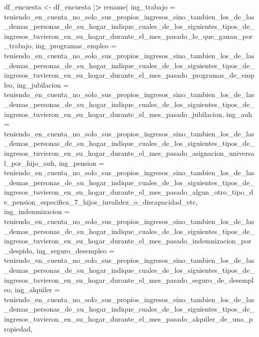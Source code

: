 \documentclass[
]{book}
\newenvironment{Shaded}{\begin{snugshade}}{\end{snugshade}}
\newcommand{\AttributeTok}[1]{\textcolor[rgb]{0.77,0.63,0.00}{#1}}
\newcommand{\ErrorTok}[1]{\textcolor[rgb]{0.64,0.00,0.00}{\textbf{#1}}}
\newcommand{\FunctionTok}[1]{\textcolor[rgb]{0.00,0.00,0.00}{#1}}
\newcommand{\NormalTok}[1]{#1}
\newcommand{\OtherTok}[1]{\textcolor[rgb]{0.56,0.35,0.01}{#1}}
\newcommand{\SpecialCharTok}[1]{\textcolor[rgb]{0.00,0.00,0.00}{#1}}
\theoremstyle{definition}
\theoremstyle{definition}
\theoremstyle{definition}
\theoremstyle{definition}
\theoremstyle{remark}
\begin{document}
\begin{Shaded}
\begin{Highlighting}[]
\NormalTok{df\_encuesta }\OtherTok{\textless{}{-}}\NormalTok{ df\_encuesta }\SpecialCharTok{|}\ErrorTok{\textgreater{}}
\FunctionTok{rename}\NormalTok{(}
\AttributeTok{ing\_trabajo =}\NormalTok{ teniendo\_en\_cuenta\_no\_solo\_sus\_propios\_ingresos\_sino\_tambien\_los\_de\_las\_demas\_personas\_de\_su\_hogar\_indique\_cuales\_de\_los\_siguientes\_tipos\_de\_ingresos\_tuvieron\_en\_su\_hogar\_durante\_el\_mes\_pasado\_lo\_que\_ganan\_por\_trabajo,}
\AttributeTok{ing\_programas\_empleo =}\NormalTok{ teniendo\_en\_cuenta\_no\_solo\_sus\_propios\_ingresos\_sino\_tambien\_los\_de\_las\_demas\_personas\_de\_su\_hogar\_indique\_cuales\_de\_los\_siguientes\_tipos\_de\_ingresos\_tuvieron\_en\_su\_hogar\_durante\_el\_mes\_pasado\_programas\_de\_empleo,}
\AttributeTok{ing\_jubilacion =}\NormalTok{ teniendo\_en\_cuenta\_no\_solo\_sus\_propios\_ingresos\_sino\_tambien\_los\_de\_las\_demas\_personas\_de\_su\_hogar\_indique\_cuales\_de\_los\_siguientes\_tipos\_de\_ingresos\_tuvieron\_en\_su\_hogar\_durante\_el\_mes\_pasado\_jubilacion,}
\AttributeTok{ing\_auh =}\NormalTok{ teniendo\_en\_cuenta\_no\_solo\_sus\_propios\_ingresos\_sino\_tambien\_los\_de\_las\_demas\_personas\_de\_su\_hogar\_indique\_cuales\_de\_los\_siguientes\_tipos\_de\_ingresos\_tuvieron\_en\_su\_hogar\_durante\_el\_mes\_pasado\_asignacion\_universal\_por\_hijo\_auh,}
\AttributeTok{ing\_pension =}\NormalTok{ teniendo\_en\_cuenta\_no\_solo\_sus\_propios\_ingresos\_sino\_tambien\_los\_de\_las\_demas\_personas\_de\_su\_hogar\_indique\_cuales\_de\_los\_siguientes\_tipos\_de\_ingresos\_tuvieron\_en\_su\_hogar\_durante\_el\_mes\_pasado\_algun\_otro\_tipo\_de\_pension\_especifica\_7\_hijos\_invalidez\_o\_discapacidad\_etc,}
\AttributeTok{ing\_indenmizacion =}\NormalTok{ teniendo\_en\_cuenta\_no\_solo\_sus\_propios\_ingresos\_sino\_tambien\_los\_de\_las\_demas\_personas\_de\_su\_hogar\_indique\_cuales\_de\_los\_siguientes\_tipos\_de\_ingresos\_tuvieron\_en\_su\_hogar\_durante\_el\_mes\_pasado\_indemnizacion\_por\_despido,}
\AttributeTok{ing\_seguro\_desempleo =}\NormalTok{ teniendo\_en\_cuenta\_no\_solo\_sus\_propios\_ingresos\_sino\_tambien\_los\_de\_las\_demas\_personas\_de\_su\_hogar\_indique\_cuales\_de\_los\_siguientes\_tipos\_de\_ingresos\_tuvieron\_en\_su\_hogar\_durante\_el\_mes\_pasado\_seguro\_de\_desempleo,}
\AttributeTok{ing\_alquiler =}\NormalTok{ teniendo\_en\_cuenta\_no\_solo\_sus\_propios\_ingresos\_sino\_tambien\_los\_de\_las\_demas\_personas\_de\_su\_hogar\_indique\_cuales\_de\_los\_siguientes\_tipos\_de\_ingresos\_tuvieron\_en\_su\_hogar\_durante\_el\_mes\_pasado\_alquiler\_de\_una\_propiedad,}

\end{Highlighting}
\end{Shaded}
\end{document}
